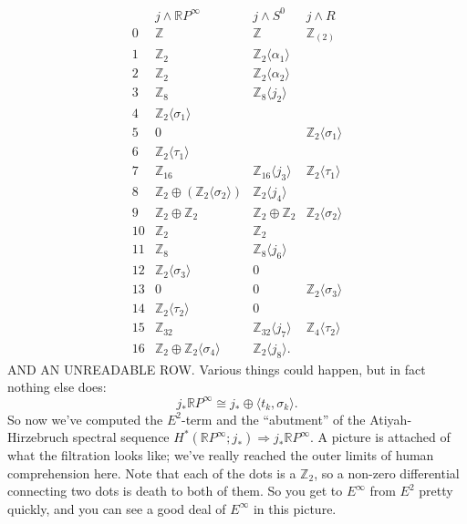 \documentclass{article}
\newcommand{\Z}{\mathbb{Z}}
\newcommand{\R}{\mathbb{R}}
\newcommand{\RP}{\R P}
\newcommand{\sprod}{\wedge}
\begin{document}
\[
\begin{array}{cccc}
& j \sprod \RP^\infty & j \sprod S^0 & j \sprod R \\
0 & \Z & \Z & \Z_{(2)} \\
1 & \Z_2 & \Z_2 \langle \alpha_1 \rangle \\
2 & \Z_2 & \Z_2 \langle \alpha_2 \rangle \\
3 & \Z_8 & \Z_8 \langle j_2 \rangle \\
4 & \Z_2 \langle \sigma_1 \rangle \\
5 & 0 & & \Z_2 \langle \sigma_1 \rangle \\
6 & \Z_2 \langle \tau_1 \rangle \\
7 & \Z_{16} & \Z_{16} \langle j_3 \rangle & \Z_2 \langle \tau_1 \rangle \\
8 & \Z_2 \oplus (\Z_2 \langle \sigma_2 \rangle) & \Z_2 \langle j_4 \rangle \\
9 & \Z_2 \oplus \Z_2 & \Z_2 \oplus \Z_2 & \Z_2 \langle \sigma_2 \rangle \\
10 & \Z_2 & \Z_2 \\
11 & \Z_8 & \Z_8 \langle j_6 \rangle \\
12 & \Z_2 \langle \sigma_3 \rangle & 0 \\
13 & 0 & 0 & \Z_2 \langle \sigma_3 \rangle \\
14 & \Z_2 \langle \tau_2 \rangle  & 0 \\
15 & \Z_{32} & \Z_{32} \langle j_7 \rangle & \Z_4 \langle \tau_2 \rangle \\
16 & \Z_2 \oplus \Z_2 \langle \sigma_4 \rangle & \Z_2 \langle j_8 \rangle.
\end{array}
\]
AND AN UNREADABLE ROW.  Various things could happen, but in fact nothing else does:
\[
j_* \RP^\infty \cong j_* \oplus \langle t_k, \sigma_k \rangle.
\]
So now we've computed the $E^2$-term and the ``abutment'' of the Atiyah-Hirzebruch spectral sequence $H^*(\RP^\infty; j_*) \Rightarrow j_* \RP^\infty$.  A picture is attached of what the filtration looks like; we've really reached the outer limits of human comprehension here.  Note that each of the dots is a $\Z_2$, so a non-zero differential connecting two dots is death to both of them.  So you get to $E^\infty$ from $E^2$ pretty quickly, and you can see a good deal of $E^\infty$ in this picture.
\end{document}
